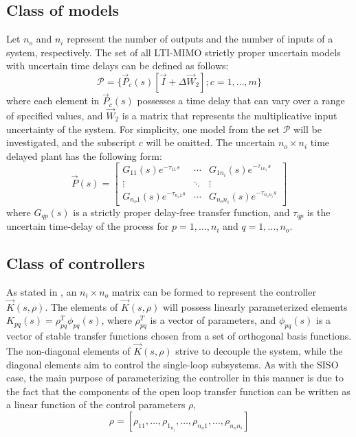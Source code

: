 \documentclass[default]{svmult}
\begin{document}
\subsection{Class of models}
Let $n_o$ and $n_i$ represent the number of outputs and the number of inputs of a system, respectively. The set of all LTI-MIMO strictly proper uncertain models with uncertain time delays can be defined as follows: 
\begin{equation}\label{eq:setpmimo}
\mathcal{P}=\{\vec{P}_c(s)[\vec{I}+\Delta \vec{W}_2]; c=1,\ldots,m\}
\end{equation}
where each element in $\vec{P}_c(s)$ possesses a time delay that can vary over a range of specified values, and $\vec{W}_2$ is a matrix that represents the multiplicative input uncertainty of the system. For simplicity, one model from the set $\mathcal{P}$ will be investigated, and the subscript $c$ will be omitted. The uncertain $n_o \times n_i$ time delayed plant has the following form:
\begin{equation}\label{eq:mimo_p}
\vec{P}(s)=
\begin{bmatrix}
G_{11}(s)e^{-\tau_{11} s} & \cdots & G_{1n_{i}}(s)e^{-\tau_{1n_{i}} s} \\ \vdots & \ddots & \vdots \\ G_{n_{o}1}(s)e^{-\tau_{n_{o}1} s} & \cdots & G_{n_{o}n_{i}}(s)e^{-\tau_{n_{o}n_{i}} s}
\end{bmatrix}
\end{equation}
where $G_{qp}(s)$ is a strictly proper delay-free transfer function, and $\tau_{qp}$ is the uncertain time-delay of the process for $p=1,\ldots, n_i$ and $q=1,\ldots, n_o$. 


\subsection{Class of controllers}
As stated in \cite{GKL10b}, an $n_i \times n_o$ matrix can be formed to represent the controller $\vec{K}(s,\rho)$. The elements of $\vec{K}(s,\rho)$ will possess linearly parameterized elements $K_{pq}(s)=\rho^T_{pq}\phi_{pq}(s)$, where $\rho^T_{pq}$ is a vector of parameters, and $\phi_{pq}(s)$ is a vector of stable transfer functions chosen from a set of orthogonal basis functions. The non-diagonal elements of $\vec{K}(s,\rho)$ strive to decouple the system, while the diagonal elements aim to control the single-loop subsystems. As with the SISO case, the main purpose of parameterizing the controller in this manner is due to the fact that the components of the open loop transfer function can be written as a linear function of the control parameters $\rho$,
\begin{equation}
\rho=[\rho_{11},\ldots,\rho_{1_{n_{i}}},\ldots,\rho_{n_{o}1},\ldots,\rho_{n_{o}n_{i}}]
\end{equation}
\end{document}
